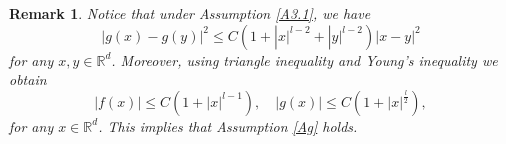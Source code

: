 \documentclass[preprint,12pt,compress]{elsarticle}
\newtheorem{remark}[theorem]{Remark}
\begin{document}
\begin{remark}  \label{remark-2}
Notice that under Assumption \ref{A3.1}, we have
\begin{equation}  \label{g}
	{\left| {g(x) - g(y)} \right|^2} \le C\left( {1 + |x{|^{l-2}} + |y{|^{l-2}}} \right){\left| {x - y} \right|^2}
\end{equation}
for any $ x, y \in \mathbb{R}^d$.
Moreover, using triangle inequality and Young's inequality we obtain
\begin{equation}   \label{fg-super}
	\left| {f(x)} \right| \le  C\left( {1 + |x{|^{l - 1}}} \right), \quad \left| {g(x)} \right| \le C\left( {1 + |x{|^{\frac{l}{2}}}} \right), 
\end{equation}
for any $ x \in \mathbb{R}^d$.
This implies that Assumption \ref{Ag} holds.
\end{remark}
\end{document}
